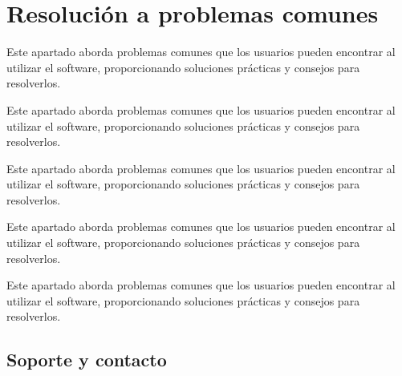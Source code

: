 \documentclass{Pretexto/bluereport}
\begin{document}
\section{Resolución a problemas comunes}
\begin{definicion}
    Este apartado aborda problemas comunes que los usuarios pueden encontrar al utilizar el software, 
    proporcionando soluciones prácticas y consejos para resolverlos.
\end{definicion}
\vspace{0.7cm}
\begin{definicion}
    Este apartado aborda problemas comunes que los usuarios pueden encontrar al utilizar el software, 
    proporcionando soluciones prácticas y consejos para resolverlos.
\end{definicion}
\vspace{0.7cm}
\begin{definicion}
    Este apartado aborda problemas comunes que los usuarios pueden encontrar al utilizar el software, 
    proporcionando soluciones prácticas y consejos para resolverlos.
\end{definicion}
\vspace{0.7cm}
\begin{definicion}
    Este apartado aborda problemas comunes que los usuarios pueden encontrar al utilizar el software, 
    proporcionando soluciones prácticas y consejos para resolverlos.
\end{definicion}
\vspace{0.7cm}
\begin{definicion}
    Este apartado aborda problemas comunes que los usuarios pueden encontrar al utilizar el software, 
    proporcionando soluciones prácticas y consejos para resolverlos.
\end{definicion}

\subsection{Soporte y contacto}
\pagebreak
\end{document}
